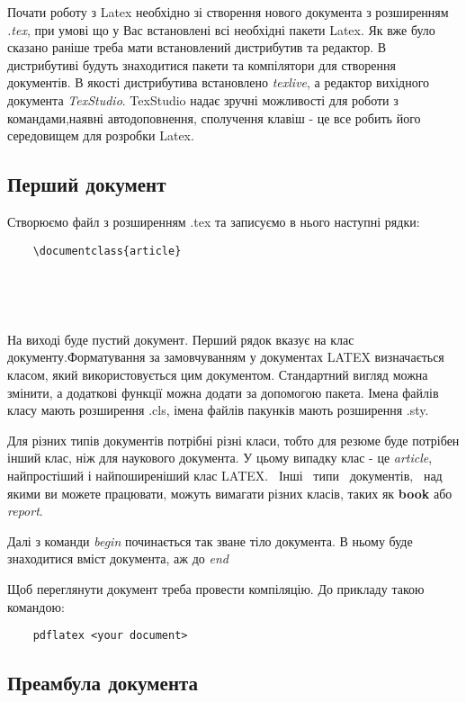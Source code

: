 
Почати роботу з Latex необхідно зі створення нового документа з розширенням \textit{.tex}, при умові що у Вас встановлені всі необхідні пакети Latex. Як вже було сказано раніше треба мати встановлений дистрибутив та редактор. В дистрибутиві будуть знаходитися пакети та компілятори для створення документів. В якості дистрибутива встановлено \textit{texlive}, а редактор вихідного документа \textit{TexStudio}. TexStudio надає зручні можливості для роботи з  командами,наявні автодоповнення, сполучення клавіш - це все робить його  середовищем  для розробки Latex.

\subsection{Перший документ}

Створюємо файл з розширенням .tex та записуємо в нього наступні рядки:

\begin{lstlisting}
	\documentclass{article}
	
	
	
	
\end{lstlisting}

На виході буде пустий документ. Перший рядок вказує на клас документу.Форматування за замовчуванням у документах LATEX визначається класом, який використовується цим документом. Стандартний вигляд можна змінити, а додаткові функції можна додати за допомогою пакета. Імена файлів класу мають розширення .cls, імена файлів пакунків мають розширення .sty.

Для різних типів документів потрібні різні класи, тобто для резюме буде потрібен інший клас, ніж для  наукового документа. У цьому випадку клас - це \textit{article}, найпростіший і найпоширеніший клас LATEX. \ Інші \ типи \ документів, \ над \newpage \noindent якими ви можете працювати, можуть вимагати різних класів, таких як \textbf{book} або \textit{report}.

Далі з команди \textit{begin} починається так зване тіло документа. В ньому буде знаходитися вміст документа, аж до \textit{end}

Щоб переглянути документ треба провести компіляцію. До прикладу такою командою:

\begin{lstlisting}
	pdflatex <your document> 
\end{lstlisting}

\subsection{Преамбула документа}


